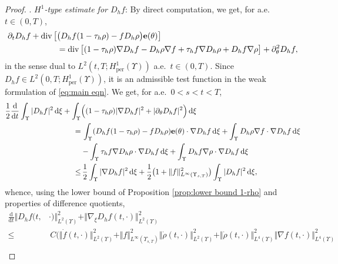 \documentclass[11pt,a4paper,reqno]{amsart}
\theoremstyle{remark}
\theoremstyle{definition}
\numberwithin{equation}{section}
\newcommand{\per}{\mathrm{per}}
\DeclareMathOperator{\dv}{div}
\newcommand{\e}{{\bf e}}
\newcommand{\bxi}{\xi}
\renewcommand{\d}{\, \mathrm{d} }
\newcommand{\der}{\mathrm{d}}
\begin{document}
\begin{proof}
. \textit{$H^1$-type estimate for $D_h f$}: By direct computation, we get, for a.e.~$t \in (0,T)$, 
\begin{equation}\label{eq:time diff quot eqn i}
 \begin{aligned} \partial_t D_h f +   \dv\big[ & \big(D_h f (1-\tau_h \rho) - f D_h \rho \big)\e(\theta) \big] \\ 
 &= \dv\big[ (1-\tau_h \rho) \nabla D_h f - D_h \rho \nabla f + \tau_h f \nabla D_h \rho + D_h f \nabla \rho \big] + \partial^2_\theta D_h f, 
 \end{aligned}
\end{equation}
in the sense dual to $L^2(t,T;H^1_\per(\Upsilon))$ a.e.~$t \in (0,T)$. Since $D_h f \in L^2(0,T;H^1_\per(\Upsilon))$, it is an admissible test function in the weak formulation of \eqref{eq:main eqn}. We get, for a.e.~$0<s<t <T$, 
\begin{equation*}
    \begin{aligned}
        \frac{1}{2}\frac{\der}{\der t}\int_\Upsilon |D_h f|^2 \d \bxi +\int_\Upsilon & \Big( (1-\tau_h \rho) |\nabla D_h f|^2 + |\partial_\theta D_h f|^2 \Big) \d \bxi   \\ 
        =& \,   \int_\Upsilon (D_h f (1-\tau_h \rho) - f D_h \rho) \e(\theta) \cdot \nabla D_h f \d \bxi + \int_\Upsilon D_h \rho \nabla f \cdot \nabla D_h f \d \bxi \\ 
            &  - \int_\Upsilon  \tau_h f \nabla D_h \rho \cdot \nabla D_h f \d \bxi   + \int_\Upsilon D_h f \nabla \rho \cdot \nabla D_h f \d \bxi           \\ 
        \leq& \, \frac{1}{2}\int_\Upsilon |\nabla D_h f|^2 \d \bxi + \frac{1}{2}\big( 1 + \Vert f \Vert_{L^\infty(\Upsilon_{s,T})}^2 \big) \int_\Upsilon |D_h f|^2 \d \bxi, 
    \end{aligned}
\end{equation*}
whence, using the lower bound of Proposition \ref{prop:lower bound 1-rho} and properties of difference quotients, 
\begin{equation*}
    \begin{aligned}
        \frac{\der}{\der t} \Vert D_h f(t,&\cdot) \Vert_{L^2(\Upsilon)}^2 + \Vert \nabla_{\bxi} D_h f(t,\cdot) \Vert_{L^2(\Upsilon)}^2   \\ 
        \leq& \,C\Big( \Vert \dot{f}(t,\cdot) \Vert_{L^2(\Upsilon)}^2 \! + \Vert f \Vert_{L^\infty(\Upsilon_{s,T})}^2 \Vert \dot{\rho}(t,\cdot)\Vert_{L^2(\Upsilon)}^2 \! + \Vert \dot{\rho}(t,\cdot) \Vert^2_{L^4(\Upsilon)} \Vert \nabla f(t,\cdot) \Vert^2_{L^4(\Upsilon)} \\ 

\end{aligned}
\end{equation*}
\end{proof}
\end{document}
